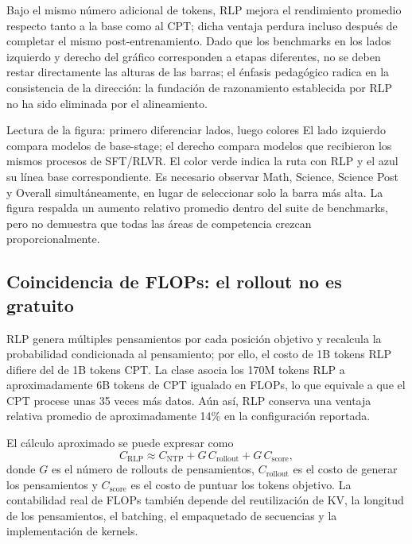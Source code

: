 Bajo el mismo número adicional de tokens, RLP mejora el rendimiento promedio respecto tanto a la base como al CPT; dicha ventaja perdura incluso después de completar el mismo post-entrenamiento. Dado que los benchmarks en los lados izquierdo y derecho del gráfico corresponden a etapas diferentes, no se deben restar directamente las alturas de las barras; el énfasis pedagógico radica en la consistencia de la dirección: la fundación de razonamiento establecida por RLP no ha sido eliminada por el alineamiento.


\begin{knowledgebox}{Lectura de la figura: primero diferenciar lados, luego colores}
El lado izquierdo compara modelos de base-stage; el derecho compara modelos que recibieron los mismos procesos de SFT/RLVR. El color verde indica la ruta con RLP y el azul su línea base correspondiente. Es necesario observar Math, Science, Science Post y Overall simultáneamente, en lugar de seleccionar solo la barra más alta. La figura respalda un aumento relativo promedio dentro del suite de benchmarks, pero no demuestra que todas las áreas de competencia crezcan proporcionalmente.
\end{knowledgebox}

\subsection{Coincidencia de FLOPs: el rollout no es gratuito}

RLP genera múltiples pensamientos por cada posición objetivo y recalcula la probabilidad condicionada al pensamiento; por ello, el costo de 1B tokens RLP difiere del de 1B tokens CPT. La clase asocia los 170M tokens RLP a aproximadamente 6B tokens de CPT igualado en FLOPs, lo que equivale a que el CPT procese unas 35 veces más datos. Aún así, RLP conserva una ventaja relativa promedio de aproximadamente 14\% en la configuración reportada.


El cálculo aproximado se puede expresar como
\[
C_{\mathrm{RLP}}
\approx C_{\mathrm{NTP}}+G\,C_{\mathrm{rollout}}+G\,C_{\mathrm{score}},
\]
donde $G$ es el número de rollouts de pensamientos, $C_{\mathrm{rollout}}$ es el costo de generar los pensamientos y $C_{\mathrm{score}}$ es el costo de puntuar los tokens objetivo. La contabilidad real de FLOPs también depende del reutilización de KV, la longitud de los pensamientos, el batching, el empaquetado de secuencias y la implementación de kernels.

